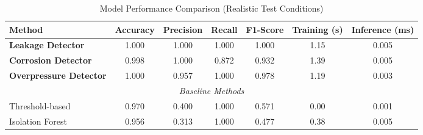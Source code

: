 \begin{table}[h]
\centering
\caption{Model Performance Comparison (Realistic Test Conditions)}
\begin{tabular}{lcccccc}
\hline
Method & Accuracy & Precision & Recall & F1-Score & Training (s) & Inference (ms) \\
\hline
\textbf{Leakage Detector} & 1.000 & 1.000 & 1.000 & 1.000 & 1.15 & 0.005 \\
\textbf{Corrosion Detector} & 0.998 & 1.000 & 0.872 & 0.932 & 1.39 & 0.005 \\
\textbf{Overpressure Detector} & 1.000 & 0.957 & 1.000 & 0.978 & 1.19 & 0.003 \\
\hline
\multicolumn{7}{c}{\textit{Baseline Methods}} \\
\hline
Threshold-based & 0.970 & 0.400 & 1.000 & 0.571 & 0.00 & 0.001 \\
Isolation Forest & 0.956 & 0.313 & 1.000 & 0.477 & 0.38 & 0.005 \\
\hline
\end{tabular}
\label{tab:model_comparison}
\end{table}
